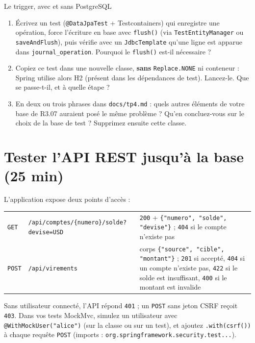 \documentclass[11pt]{article}
\begin{document}
\begin{exobox}{Le trigger, avec et sans PostgreSQL}
\begin{enumerate}[leftmargin=1.4em]
  \item Écrivez un test (\texttt{@DataJpaTest} + Testcontainers) qui enregistre une opération, force l'écriture en base avec \texttt{flush()} (via \texttt{TestEntityManager} ou \texttt{saveAndFlush}), puis vérifie avec un \texttt{JdbcTemplate} qu'une ligne est apparue dans \texttt{journal\_operation}. Pourquoi le \texttt{flush()} est-il nécessaire ?
  \item Copiez ce test dans une nouvelle classe, \textbf{sans} \texttt{Replace.NONE} ni conteneur : Spring utilise alors H2 (présent dans les dépendances de test). Lancez-le. Que se passe-t-il, et à quelle étape ?
  \item En deux ou trois phrases dans \texttt{docs/tp4.md} : quels autres éléments de votre base de R3.07 auraient posé le même problème ? Qu'en concluez-vous sur le choix de la base de test ? Supprimez ensuite cette classe.
\end{enumerate}
\end{exobox}

\section{Tester l'API REST jusqu'à la base (25 min)}

L'application expose deux points d'accès :

\begin{center}
\renewcommand{\arraystretch}{1.25}
\small
\begin{tabular}{@{}l l >{\raggedright\arraybackslash}p{7.2cm}@{}}
\toprule
\texttt{GET} & \texttt{/api/comptes/\{numero\}/solde?devise=USD} & \texttt{200} + \texttt{\{"numero", "solde", "devise"\}} ; \texttt{404} si le compte n'existe pas \\
\texttt{POST} & \texttt{/api/virements} & corps \texttt{\{"source", "cible", "montant"\}} ; \texttt{201} si accepté, \texttt{404} si un compte n'existe pas, \texttt{422} si le solde est insuffisant, \texttt{400} si le montant est invalide \\
\bottomrule
\end{tabular}
\end{center}

\begin{infobox}
Sans utilisateur connecté, l'API répond \texttt{401} ; un \texttt{POST} sans jeton CSRF reçoit \texttt{403}. Dans vos tests MockMvc, simulez un utilisateur avec \texttt{@WithMockUser("alice")} (sur la classe ou sur un test), et ajoutez \texttt{.with(csrf())} à chaque requête \texttt{POST} (imports : \texttt{org.springframework.security.test...}).
\end{infobox}
\end{document}
